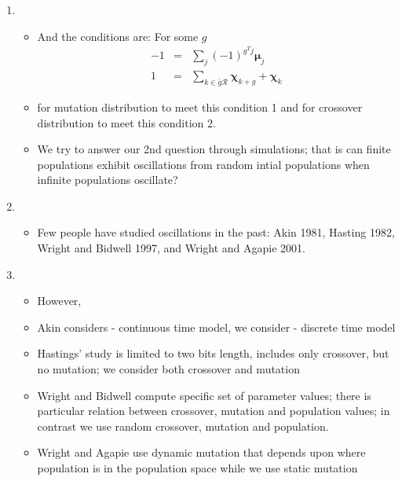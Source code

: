 \documentclass{article}
\begin{document}
\begin{enumerate}
\item
  \begin{itemize}
  \item And the conditions are: For some $g$
  \begin{eqnarray*}
      -1 &=& \sum \limits_{j} (-1)^{g^T j} \bm{\mu}_j \\
      1 &=& \sum \limits_{k \in \bar{g}\mathcal{R}} \bm{\chi}_{k+g} + \bm{\chi}_k 
      \end{eqnarray*}
  \item for mutation distribution to meet this condition 1 and for crossover  distribution to meet this condition 2.
  \item We try to answer our 2nd question through simulations; that is can finite populations exhibit
     oscillations from random intial populations when infinite populations oscillate?
  \end{itemize}
    
\item
  \begin{itemize}
    \item Few people have studied oscillations in the past: Akin 1981, Hasting 1982, Wright and Bidwell 1997, and Wright and Agapie 2001.
  \end{itemize}

    
\item
  \begin{itemize}
  \item  However,
  \item Akin considers - continuous time model, we consider -
    discrete time model
   \item Hastings' study is limited to two bits length, includes only
     crossover, but no mutation; we consider both crossover and mutation
  \item Wright and Bidwell compute specific set of parameter values; there is particular relation between crossover, mutation and population values; in contrast we use random crossover, mutation and population.
  \item Wright and Agapie use dynamic mutation that depends upon
    where population is in the population space while we use static
    mutation
  \end{itemize}


\end{enumerate}
\end{document}
